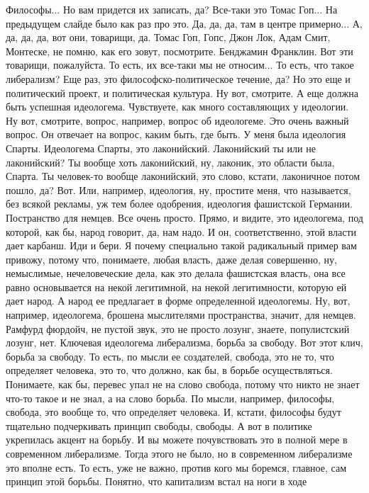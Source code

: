 Философы... Но вам придется их записать, да? Все-таки это Томас Гоп... На
предыдущем слайде было как раз про это. Да, да, да, там в центре примерно... А,
да, да, да, вот они, товарищи, да. Томас Гоп, Гопс, Джон Лок, Адам Смит,
Монтеске, не помню, как его зовут, посмотрите. Бенджамин Франклин. Вот эти
товарищи, пожалуйста. То есть, их все-таки мы не относим... То есть, что такое
либерализм? Еще раз, это философско-политическое течение, да? Но это еще и
политический проект, и политическая культура. Ну вот, смотрите. А еще должна
быть успешная идеологема. Чувствуете, как много составляющих у идеологии. Ну
вот, смотрите, вопрос, например, вопрос об идеологеме. Это очень важный вопрос.
Он отвечает на вопрос, каким быть, где быть. У меня была идеология Спарты.
Идеологема Спарты, это лаконийский. Лаконийский ты или не лаконийский? Ты вообще
хоть лаконийский, ну, лаконик, это области была, Спарта. Ты человек-то вообще
лаконийский, это слово, кстати, лаконичное потом пошло, да? Вот. Или, например,
идеология, ну, простите меня, что называется, без всякой рекламы, уж тем более
одобрения, идеология фашистской Германии. Постранство для немцев. Все очень
просто. Прямо, и видите, это идеологема, под которой, как бы, народ говорит, да,
нам надо. И он, соответственно, этой власти дает карбанш. Иди и бери. Я почему
специально такой радикальный пример вам привожу, потому что, понимаете, любая
власть, даже делая совершенно, ну, немыслимые, нечеловеческие дела, как это
делала фашистская власть, она все равно основывается на некой легитимной, на
некой легитимности, которую ей дает народ. А народ ее предлагает в форме
определенной идеологемы. Ну, вот, например, идеологема, брошена мыслителями
пространства, значит, для немцев. Рамфурд фюрдойч, не пустой звук, это не просто
лозунг, знаете, популистский лозунг, нет. Ключевая идеологема либерализма,
борьба за свободу. Вот этот клич, борьба за свободу. То есть, по мысли ее
создателей, свобода, это не то, что определяет человека, это то, что должно, как
бы, в борьбе осуществляться. Понимаете, как бы, перевес упал не на слово
свобода, потому что никто не знает что-то такое и не знал, а на слово борьба. По
мысли, например, философы, свобода, это вообще то, что определяет человека. И,
кстати, философы будут тщательно подчеркивать принцип свободы, свободы. А вот в
политике укрепилась акцент на борьбу. И вы можете почувствовать это в полной
мере в современном либерализме. Тогда этого не было, но в современном
либерализме это вполне есть. То есть, уже не важно, против кого мы боремся,
главное, сам принцип этой борьбы. Понятно, что капитализм встал на ноги в ходе
